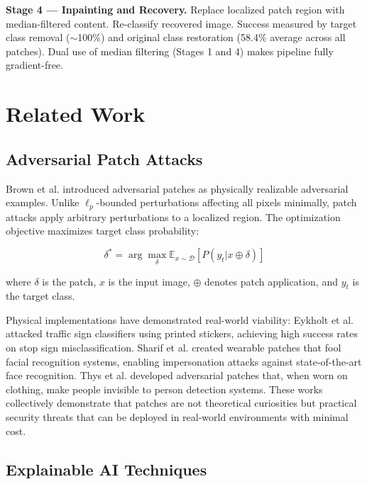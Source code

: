\documentclass[conference]{IEEEtran}
\begin{document}
\textbf{Stage 4 --- Inpainting and Recovery.} Replace localized patch region with median-filtered content. Re-classify recovered image. Success measured by target class removal ($\sim$100\%) and original class restoration (58.4\% average across all patches). Dual use of median filtering (Stages 1 and 4) makes pipeline fully gradient-free.

\section{Related Work}

\subsection{Adversarial Patch Attacks}

Brown et al. \cite{brown2017adversarial} introduced adversarial patches as physically realizable adversarial examples. Unlike $\ell_p$-bounded perturbations affecting all pixels minimally, patch attacks apply arbitrary perturbations to a localized region. The optimization objective maximizes target class probability:

\begin{equation}
\delta^* = \arg\max_{\delta} \mathbb{E}_{x \sim \mathcal{D}} \left[ P(y_t | x \oplus \delta) \right]
\end{equation}

where $\delta$ is the patch, $x$ is the input image, $\oplus$ denotes patch application, and $y_t$ is the target class.

Physical implementations have demonstrated real-world viability: Eykholt et al. \cite{eykholt2018robust} attacked traffic sign classifiers using printed stickers, achieving high success rates on stop sign misclassification. Sharif et al. \cite{sharif2016accessorize} created wearable patches that fool facial recognition systems, enabling impersonation attacks against state-of-the-art face recognition. Thys et al. \cite{thys2019fooling} developed adversarial patches that, when worn on clothing, make people invisible to person detection systems. These works collectively demonstrate that patches are not theoretical curiosities but practical security threats that can be deployed in real-world environments with minimal cost.

\subsection{Explainable AI Techniques}
\end{document}
